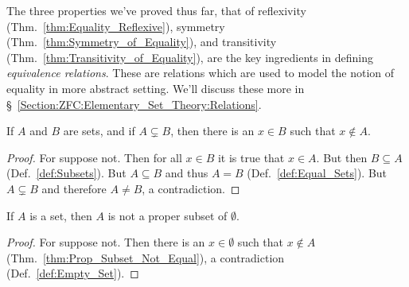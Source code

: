         The three properties we've proved thus far, that of reflexivity
        (Thm.~\ref{thm:Equality_Reflexive}), symmetry
        (Thm.~\ref{thm:Symmetry_of_Equality}), and transitivity
        (Thm.~\ref{thm:Transitivity_of_Equality}), are the key ingredients in
        defining \textit{equivalence relations}.
        These are relations which are used to model the notion of equality in
        more abstract setting. We'll discuss these more in
        \S~\ref{Section:ZFC:Elementary_Set_Theory:Relations}.
        \begin{theorem}
            \label{thm:Prop_Subset_Not_Equal}%
            If $A$ and $B$ are sets, and if $A\subsetneq{B}$, then there is an
            $x\in{B}$ such that $x\notin{A}$.
        \end{theorem}
        \begin{proof}
            For suppose not. Then for all $x\in{B}$ it is true that $x\in{A}$.
            But then $B\subseteq{A}$ (Def.~\ref{def:Subsets}).
            But $A\subseteq{B}$ and thus $A=B$ (Def.~\ref{def:Equal_Sets}).
            But $A\subsetneq{B}$ and therefore $A\ne{B}$, a contradiction.
        \end{proof}
        \begin{theorem}
            If $A$ is a set, then $A$ is not a proper subset of $\emptyset$.
        \end{theorem}
        \begin{proof}
            For suppose not. Then there is an $x\in\emptyset$ such that
            $x\notin{A}$ (Thm.~\ref{thm:Prop_Subset_Not_Equal}), a
            contradiction (Def.~\ref{def:Empty_Set}).
        \end{proof}
